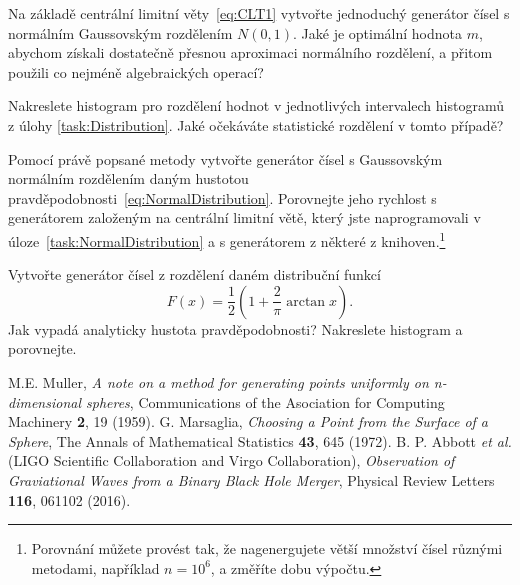 \documentclass[a4paper,11pt,twoside]{article}
\theoremstyle{red}
\theoremstyle{green}
\begin{document}
        \begin{task}\label{task:NormalDistribution}
            Na základě centrální limitní věty~\eqref{eq:CLT1} vytvořte jednoduchý generátor čísel s normálním Gaussovským rozdělením $N(0,1)$.
            Jaké je optimální hodnota $m$, abychom získali dostatečně přesnou aproximaci normálního rozdělení, a přitom použili co nejméně algebraických operací?
        \end{task}
                
        \begin{task}
            Nakreslete histogram pro rozdělení hodnot v jednotlivých intervalech histogramů z úlohy \ref{task:Distribution}.
            Jaké očekáváte statistické rozdělení v tomto případě?
        \end{task}
        
        \begin{task}\label{task:GeneratorTime}
        Pomocí právě popsané metody vytvořte generátor čísel s Gaussovským normálním rozdělením daným hustotou pravděpodobnosti~\eqref{eq:NormalDistribution}.
        Porovnejte jeho rychlost s generátorem založeným na centrální limitní větě, který jste naprogramovali v úloze~\ref{task:NormalDistribution} a s generátorem z některé z knihoven.\footnote{Porovnání můžete provést tak, že nagenergujete větší množství čísel různými metodami, například $n=10^{6}$, a změříte dobu výpočtu.} 
    \end{task}

    \begin{task}
        Vytvořte generátor čísel z rozdělení daném distribuční funkcí
        \begin{equation}
            \label{eq:F}
            F(x)=\frac{1}{2}\left(1+\frac{2}{\pi}\arctan{x}\right).
        \end{equation}
        Jak vypadá analyticky hustota pravděpodobnosti?
        Nakreslete histogram a porovnejte.
    \end{task}


\begin{thebibliography}{99}
     M.E. Muller, {\it A note on a method for generating points uniformly on n-dimensional spheres},
    Communications of the Asociation for Computing Machinery {\bf 2}, 19 (1959).
     G. Marsaglia, {\it Choosing a Point from the Surface of a Sphere},
    The Annals of Mathematical Statistics {\bf 43}, 645 (1972).
     B. P. Abbott {\it et al.} (LIGO Scientific Collaboration and Virgo Collaboration), {\it Observation of Graviational Waves from a Binary Black Hole Merger}, Physical Review Letters {\bf 116}, 061102 (2016).
\end{thebibliography}
\end{document}
